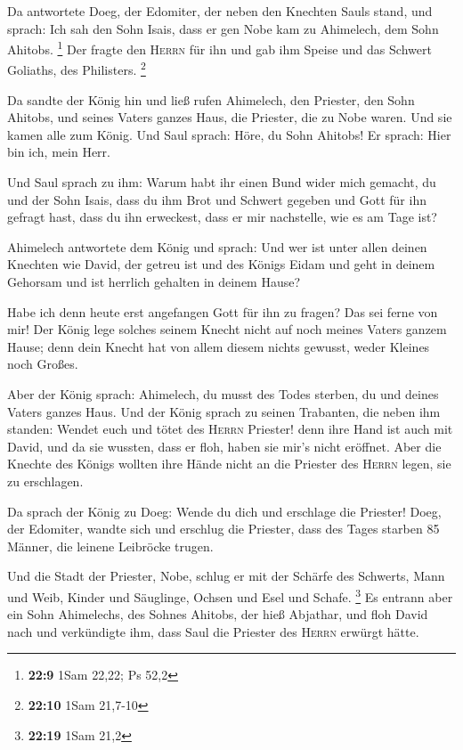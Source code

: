  Da antwortete Doeg, der Edomiter, der neben den Knechten
Sauls stand, und sprach: Ich sah den Sohn Isais, dass er gen Nobe kam zu
Ahimelech, dem Sohn Ahitobs. \footnote{\textbf{22:9} 1Sam 22,22; Ps 52,2}
 Der fragte den \textsc{Herrn} für ihn und gab ihm Speise
und das Schwert Goliaths, des Philisters. \footnote{\textbf{22:10} 1Sam
  21,7-10}

 Da sandte der König hin und ließ rufen Ahimelech, den
Priester, den Sohn Ahitobs, und seines Vaters ganzes Haus, die Priester,
die zu Nobe waren. Und sie kamen alle zum König.  Und
Saul sprach: Höre, du Sohn Ahitobs! Er sprach: Hier bin ich, mein Herr.

 Und Saul sprach zu ihm: Warum habt ihr einen Bund wider
mich gemacht, du und der Sohn Isais, dass du ihm Brot und Schwert
gegeben und Gott für ihn gefragt hast, dass du ihn erweckest, dass er
mir nachstelle, wie es am Tage ist?

 Ahimelech antwortete dem König und sprach: Und wer ist
unter allen deinen Knechten wie David, der getreu ist und des Königs
Eidam und geht in deinem Gehorsam und ist herrlich gehalten in deinem
Hause?

 Habe ich denn heute erst angefangen Gott für ihn zu
fragen? Das sei ferne von mir! Der König lege solches seinem Knecht
nicht auf noch meines Vaters ganzem Hause; denn dein Knecht hat von
allem diesem nichts gewusst, weder Kleines noch Großes.

 Aber der König sprach: Ahimelech, du musst des Todes
sterben, du und deines Vaters ganzes Haus.  Und der König
sprach zu seinen Trabanten, die neben ihm standen: Wendet euch und tötet
des \textsc{Herrn} Priester! denn ihre Hand ist auch mit David, und da
sie wussten, dass er floh, haben sie mir's nicht eröffnet. Aber die
Knechte des Königs wollten ihre Hände nicht an die Priester des
\textsc{Herrn} legen, sie zu erschlagen.

 Da sprach der König zu Doeg: Wende du dich und erschlage
die Priester! Doeg, der Edomiter, wandte sich und erschlug die Priester,
dass des Tages starben 85 Männer, die leinene Leibröcke trugen.

 Und die Stadt der Priester, Nobe, schlug er mit der
Schärfe des Schwerts, Mann und Weib, Kinder und Säuglinge, Ochsen und
Esel und Schafe. \footnote{\textbf{22:19} 1Sam 21,2}  Es
entrann aber ein Sohn Ahimelechs, des Sohnes Ahitobs, der hieß Abjathar,
und floh David nach  und verkündigte ihm, dass Saul die
Priester des \textsc{Herrn} erwürgt hätte.

